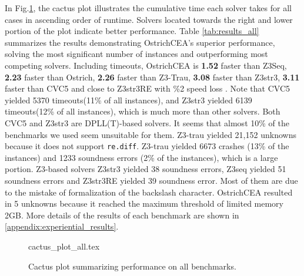 {%
In Fig.\ref{fig:cactus_all}, the cactus plot illustrates the cumulative time each solver takes for all cases in ascending order of runtime. Solvers located towards the right and lower portion of the plot indicate better performance. \newline
Table \ref{tab:results_all} summarizes the results demonstrating OstrichCEA's superior performance, solving the most significant number of instances and outperforming most competing solvers. Including timeouts, OstrichCEA is \textbf{1.52}\mult{} faster than Z3Seq, \textbf{2.23}\mult{} faster than Ostrich, \textbf{2.26}\mult{} faster than Z3-Trau, \textbf{3.08}\mult{} faster than Z3str3, \textbf{3.11}\mult{} faster than CVC5 and close to Z3str3RE with \%2 speed loss . Note that CVC5\cite{cvc5} yielded 5370 timeouts(11\% of all instances), and Z3str3\cite{z3str3} yielded 6139 timeouts(12\% of all instances), which is much more than other solvers. Both CVC5 and Z3str3 are DPLL(T)-based solvers. It seems that almost 10\% of the benchmarks we used seem unsuitable for them. Z3-trau\cite{z3trau} yielded 21,152 unknowns because it does not support \verb|re.diff|. Z3-trau\cite{z3trau} yielded 6673 crashes (13\% of the instances) and 1233 soundness errors (2\% of the instances), which is a large portion. Z3-based solvers Z3str3 yielded 38 soundness errors, Z3seq\cite{z3seq} yielded 51 soundness errors and Z3str3RE\cite{z3str3re} yielded 39 soundness error. Most of them are due to the mistake of formalization of the backslash character. OstrichCEA resulted in 5 unknowns because it reached the maximum threshold of limited memory 2GB. More details of the results of each benchmark are shown in \ref{appendix:experiential_results}.
\begin{figure}[h]
  \centering
  {cactus_plot_all.tex}
  \caption{Cactus plot summarizing performance on all benchmarks.}
  \label{fig:cactus_all}
\end{figure}

}
